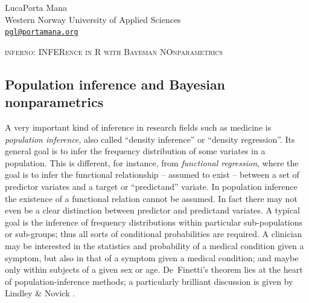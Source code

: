 
\newcommand{\citebi}{\cite}
\newcommand{\citein}[1]{\textnormal{\cite{#1}}}
\newcommand*{\subtitleproc}[1]{}
\newcommand*{\chapb}{}
\providecommand{\doi}[1]{}
\renewcommand{\doi}[1]{\href{https://doi.org/#1}{doi:#1}}
\newcommand*{\osfdoi}[1]{Open Science Framework \doi{#1}}
\newcommand*{\arxivdoi}[1]{arXiv \doi{#1}}
\newcommand*{\amp}{\&}
\renewcommand*{\P}{\mathrm{P}}%
\renewcommand*{\|}[1][]{\nonscript\:#1\vert\nonscript\:\mathopen{}}
\newcommand*{\mo}[1][=]{\mathclose{}\mathord{\nonscript\mkern0.5mu#1\nonscript\mkern0.5mu}\mathopen{}}
\newcommand*{\yF}{F}
\newcommand*{\yf}{f}
\newcommand*{\di}{\mathop{}\!\mathrm{d}}
\newcommand*{\HV}{\mathit{HV}}
\newcommand*{\GDS}{\mathit{GDS}}
\newcommand*{\cAD}{\mathit{cAD}}
\newcommand*{\yy}{\mathrm{Y}}
\newcommand*{\yn}{\mathrm{N}}


\begin{center}
  {\large Luca\enspace Porta Mana} \\
  Western Norway University of Applied Sciences\\
{\tt \href{mailto:pgl@portamana.org}{pgl@portamana.org}}


\Large
\textsc{inferno: INFERence in R with Bayesian NOnparametrics}
\end{center}

\subsection*{Population inference and Bayesian nonparametrics}
\label{sec:popinference}

A very important kind of inference in research fields such as medicine is \emph{population inference}, also called ``density inference'' or ``density regression''. Its general goal is to infer the frequency distribution of some variates in a population. This is different, for instance, from \emph{functional regression}, where the goal is to infer the functional relationship -- assumed to exist -- between a set of predictor variates and a target or ``predictand'' variate. In population inference the existence of a functional relation cannot be assumed. In fact there may not even be a clear distinction between predictor and predictand variates. A typical goal is the inference of frequency distributions within particular sub-populations or sub-groups; thus all sorts of conditional probabilities are required. A clinician may be interested in the statistics and probability of a medical condition given a symptom, but also in that of a symptom given a medical condition; and maybe only within subjects of a given sex or age. De~Finetti's theorem \citep[see e.g.][\S\S\,4.2, 4.3, 4.6]{bernardoetal1994_r2000} lies at the heart of population-inference methods; a particularly brilliant discussion is given by Lindley \& Novick \citeyearpar{lindleyetal1981}.

